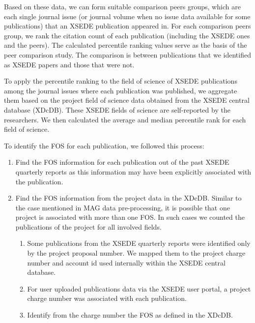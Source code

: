 \documentclass{sig-alternate}
\begin{document}
Based on these data, we can form suitable comparison peers groups,
which are each single journal issue (or journal volume when no issue
data available for some publications) that an XSEDE publication
appeared in. For each comparison peers group, we rank the citation
count of each publication (including the XSEDE ones and the
peers). The calculated percentile ranking values serve as the basis of
the peer comparison study. The comparison is between publications that
we identified as XSEDE papers and those that were not.

To apply the percentile ranking to the field of science of XSEDE
publications among the journal issues where each publication was
published, we aggregate them based on the project field
of science data obtained from the XSEDE central database
(XDcDB). These XSEDE fields of science are self-reported by the
researchers. We then calculated the average and median percentile rank
for each field of science.

To identify the FOS for each publication, we followed this process:

\begin{enumerate}

\item Find the FOS information for each publication out of the past
  XSEDE quarterly reports as this information may have been explicitly
  associated with the publication.

\item Find the FOS information from the project data in the
  XDcDB. Similar to the case mentioned in MAG data pre-processing, it
  is possible that one project is associated with more than one
  FOS. In such cases we counted the publications of the project for
  all involved fields.

\begin{enumerate}

\item Some publications from the XSEDE quarterly reports were
  identified only by the project proposal number. We mapped them to
  the project charge number and account id used internally within the
  XSEDE central database.

\item For user uploaded publications data via the XSEDE user portal, a
  project charge number was associated with each publication.

\item Identify from the charge number the FOS as defined in the XDcDB.

\end{enumerate}

\end{enumerate}
\end{document}
